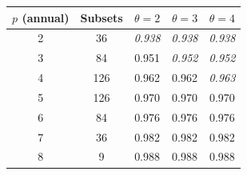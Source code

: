 \begin{tabular}{ccccc}
\toprule
$p$ (annual) & Subsets & $\theta=2$ & $\theta=3$ & $\theta=4$ \\
\midrule
2 & 36 & \textit{0.938} & \textit{0.938} & \textit{0.938} \\
3 & 84 & 0.951 & \textit{0.952} & \textit{0.952} \\
4 & 126 & 0.962 & 0.962 & \textit{0.963} \\
5 & 126 & 0.970 & 0.970 & 0.970 \\
6 & 84 & 0.976 & 0.976 & 0.976 \\
7 & 36 & 0.982 & 0.982 & 0.982 \\
8 & 9 & 0.988 & 0.988 & 0.988 \\
\bottomrule
\end{tabular}
